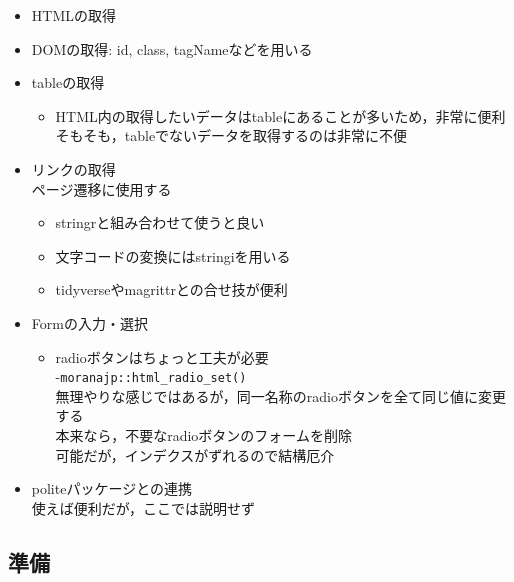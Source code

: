 \documentclass[
]{article}
\providecommand{\tightlist}{%
  \setlength{\itemsep}{0pt}\setlength{\parskip}{0pt}}
\begin{document}
\begin{itemize}
\tightlist
\item
  HTMLの取得\\
\item
  DOMの取得: id, class, tagNameなどを用いる\\
\item
  tableの取得

  \begin{itemize}
  \tightlist
  \item
    HTML内の取得したいデータはtableにあることが多いため，非常に便利\\
    そもそも，tableでないデータを取得するのは非常に不便\\
  \end{itemize}
\item
  リンクの取得\\
  ページ遷移に使用する

  \begin{itemize}
  \tightlist
  \item
    stringrと組み合わせて使うと良い\\
  \item
    文字コードの変換にはstringiを用いる\\
  \item
    tidyverseやmagrittrとの合せ技が便利\\
  \end{itemize}
\item
  Formの入力・選択

  \begin{itemize}
  \tightlist
  \item
    radioボタンはちょっと工夫が必要\\
    -\texttt{moranajp::html\_radio\_set()}\\
    無理やりな感じではあるが，同一名称のradioボタンを全て同じ値に変更する\\
    本来なら，不要なradioボタンのフォームを削除\\
    可能だが，インデクスがずれるので結構厄介\\
  \end{itemize}
\item
  politeパッケージとの連携\\
  使えば便利だが，ここでは説明せず
\end{itemize}

\hypertarget{ux6e96ux5099-10}{%
\subsection{準備}\label{ux6e96ux5099-10}}
\end{document}
